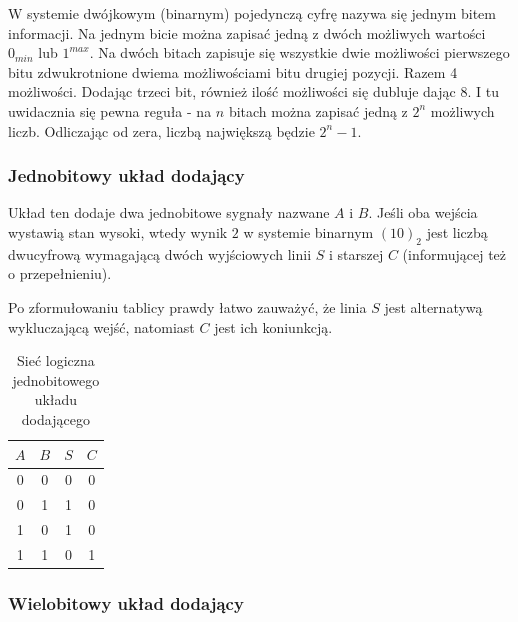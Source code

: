 \documentclass[a4paper,12pt]{article}
\begin{document}
W systemie dwójkowym (binarnym) pojedynczą cyfrę nazywa się jednym bitem informacji. Na jednym bicie można zapisać jedną z dwóch możliwych wartości $0_{min}$ lub $1^{max}$. Na dwóch bitach zapisuje się wszystkie dwie możliwości pierwszego bitu zdwukrotnione dwiema możliwościami bitu drugiej pozycji. Razem 4 możliwości. Dodając trzeci bit, również ilość możliwości się dubluje dając 8. I tu uwidacznia się pewna reguła - na $n$ bitach można zapisać jedną z $2^n$ możliwych liczb. Odliczając od zera, liczbą największą będzie $2^n-1$.

\subsubsection{Jednobitowy układ dodający}

Układ ten dodaje dwa jednobitowe sygnały nazwane $A$ i $B$. Jeśli oba wejścia wystawią stan wysoki, wtedy wynik $2$ w systemie binarnym $(10)_2$ jest liczbą dwucyfrową wymagającą dwóch wyjściowych linii $S$ i starszej $C$ (informującej też o przepełnieniu).

Po zformułowaniu tablicy prawdy łatwo zauważyć, że linia $S$ jest alternatywą wykluczającą wejść, natomiast $C$ jest ich koniunkcją.

\begin{table}[h!]
\centering

\begin{minipage}{5.5cm}
\centering

\begin{tabular}{ | c | c || c | c | }
  \hline
  $A$ & $B$ & $S$ & $C$ \\ \hline
  0 & 0 & 0 & 0 \\
  0 & 1 & 1 & 0 \\
  1 & 0 & 1 & 0 \\
  1 & 1 & 0 & 1 \\
  \hline
\end{tabular}
\end{minipage}
\begin{minipage}{11cm}
   \centering
   
   \caption*{Sieć logiczna jednobitowego układu dodającego}
\end{minipage}
\end{table}


\subsubsection{Wielobitowy układ dodający}
\end{document}
